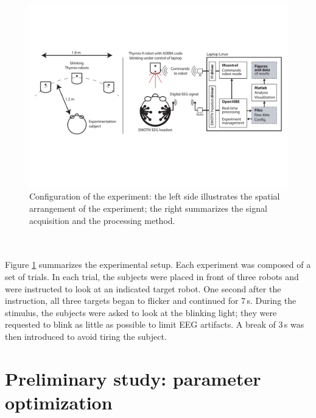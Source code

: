 \documentclass[smallextended]{svjour3}
\begin{document}
\begin{figure} \center
\includegraphics[width=\textwidth]{figures/schema-global.pdf}
\caption{Configuration of the experiment: the left side illustrates the spatial arrangement of the experiment; the right summarizes the signal acquisition and the processing method.} \label{fig:thymioinstall}
\end{figure}\\
\\
Figure \ref{fig:thymioinstall} summarizes the experimental setup. 
Each experiment was composed of a set of trials. In each trial, the subjects were placed in front of three robots and were instructed to look at an indicated target robot. 
One second after the instruction, all three targets began to flicker and continued for 7\,s. During the stimulus, the subjects were asked to look at the blinking light; they were requested to blink as little as possible to limit EEG artifacts. 
A break of 3\,s was then introduced to avoid tiring the subject. 

\section{Preliminary study: parameter optimization}
\label{sec:prestudy}
\end{document}
